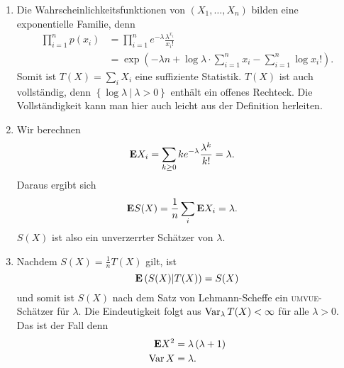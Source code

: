 \solution
\begin{enumerate}
    \item Die Wahrscheinlichkeitsfunktionen von $\left( X_1, \ldots, X_n \right)$ 
        bilden eine exponentielle Familie, denn
        \begin{align*}
            \prod_{i=1}^{n} p(x_i) &= \prod_{i=1}^n e^{-\lambda } \frac{ \lambda^{ x_i }}{ x_i!} \\
            &= \exp \left( -\lambda n + \log \lambda \cdot \sum_{i=1}^{ n} x_i 
            - \sum_{i=1}^{n} \log x_i! \right).
        \end{align*}
        Somit ist $T(X)= \sum_{i}^{} X_i$ eine suffiziente Statistik. $T(X)$
        ist auch vollständig, denn $\left\{ \log \lambda \ | \ \lambda>0
        \right\}$ enthält ein offenes Rechteck. Die Vollständigkeit kann man
        hier auch leicht aus der Definition herleiten. 
    \item Wir berechnen
        \begin{align*}
            \mathbf{E} X_i &= \sum_{k\geq 0}^{} k e^{-\lambda} \frac{\lambda^k}{ k!} = \lambda.
        \end{align*}
        Daraus ergibt sich
        \begin{align*}
            \mathbf{E} S(X) &= \frac{1}{n} \sum_{i}^{} \mathbf{E} X_i = \lambda.
        \end{align*}
        $S(X)$ ist also ein unverzerrter Schätzer von $\lambda$. 
    \item Nachdem $S(X) = \frac{1}{n} T(X)$ gilt, ist 
        \begin{equation*}
            \mathbf{E} \left( S(X) | T(X) \right) = S(X)
        \end{equation*}
        und somit ist $S(X)$ nach dem Satz von Lehmann-Scheffe ein
        \textsc{umvue}-Schätzer für $\lambda$. Die Eindeutigkeit folgt aus
        $\operatorname{Var}_\lambda T(X) < \infty$ für alle $\lambda >0$. Das ist der Fall
        denn
        \begin{align*}
            \mathbf{E} X^2 &= \lambda\left( \lambda +1 \right) \\
            \operatorname{Var} X &= \lambda.
        \end{align*}
\end{enumerate}









